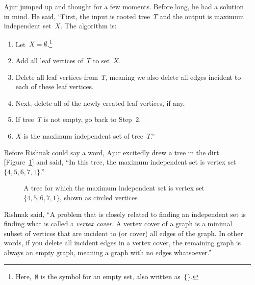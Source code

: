 Ajur jumped up and thought for a few moments. Before long, he had a solution in mind. He said, ``First, the input is rooted tree~$T$ and the output is maximum independent set~$X$. The algorithm is:
\begin{enumerate}
    \item Let~$X=\emptyset$.\footnote{Here,~$\emptyset$ is the symbol for an empty set, also written as~$\{\}$.}
    \item Add all leaf vertices of~$T$ to set~$X$.
    \item Delete all leaf vertices from~$T$, meaning we also delete all edges incident to each of these leaf vertices.
    \item Next, delete all of the newly created leaf vertices, if any.
    \item If tree~$T$ is not empty, go back to Step~2.
    \item $X$ is the maximum independent set of tree~$T$.''
\end{enumerate}

Before Rishnak could say a word, Ajur excitedly drew a tree in the dirt [Figure~\ref{13g4}] and said, ``In this tree, the maximum independent set is vertex set~$\{4,5,6,7,1\}$.''

\begin{figure}
\begin{center}

\caption{A tree for which the maximum independent set is vertex set~$\{4,5,6,7,1\}$, shown as circled vertices}\label{13g4}
\end{center}
\end{figure}

Rishnak said, ``A problem that is closely related to finding an independent set is finding what is called a \textit{vertex cover}. A vertex cover of a graph is a minimal subset of vertices that are incident to (or cover) all edges of the graph. In other words, if you delete all incident edges in a vertex cover, the remaining graph is always an empty graph, meaning a graph with no edges whatsoever.''

